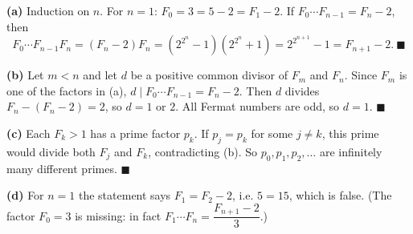 \textbf{(a)} Induction on $n$. For $n=1$: $F_0=3=5-2=F_1-2$. If $F_0\cdots F_{n-1}=F_n-2$, then
\[F_0\cdots F_{n-1}F_n=(F_n-2)F_n=\left(2^{2^n}-1\right)\left(2^{2^n}+1\right)=2^{2^{n+1}}-1=F_{n+1}-2.\ \blacksquare\]

\textbf{(b)} Let $m<n$ and let $d$ be a positive common divisor of $F_m$ and $F_n$. Since $F_m$ is one of the factors in (a), $d\mid F_0\cdots F_{n-1}=F_n-2$. Then $d$ divides $F_n-(F_n-2)=2$, so $d=1$ or $2$. All Fermat numbers are odd, so $d=1$. $\blacksquare$

\textbf{(c)} Each $F_k>1$ has a prime factor $p_k$. If $p_j=p_k$ for some $j\ne k$, this prime would divide both $F_j$ and $F_k$, contradicting (b). So $p_0,p_1,p_2,\dots$ are infinitely many different primes. $\blacksquare$

\textbf{(d)} For $n=1$ the statement says $F_1=F_2-2$, i.e. $5=15$, which is false. (The factor $F_0=3$ is missing: in fact $F_1\cdots F_n=\dfrac{F_{n+1}-2}{3}$.)
